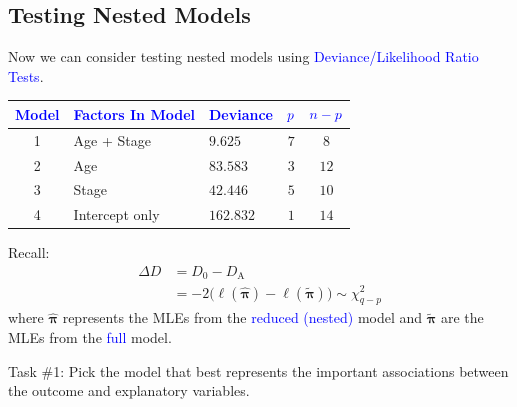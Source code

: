 \documentclass[oneside]{book}\usepackage[]{graphicx}\usepackage[svgnames]{xcolor}
\providecommand{\Vector}[1]{\bm{#1}}%
\begin{document}
\subsection*{Testing Nested Models}
Now we can consider testing nested models using \textcolor{Blue}{Deviance/Likelihood Ratio Tests}.
\begin{table}[!htbp]
      \centering
      \begin{NiceTabular}{cllcc}
            \toprule
            \textcolor{Blue}{Model} & \textcolor{Blue}{Factors In Model} & \textcolor{Blue}{Deviance} & $ \textcolor{Blue}{p} $ & $ \textcolor{Blue}{n-p} $\\
             & Age + Stage & $9.625$ & $ 7 $ & $ 8 $\\
            2 & Age & $83.583$ & $ 3 $ & $ 12 $\\
            3 & Stage & $42.446$ & $ 5 $ & $ 10 $\\
            4 & Intercept only & $162.832$ & $ 1 $ & $14 $\\
            \bottomrule
      \end{NiceTabular}
\end{table}
Recall:
\begin{align*}
      \Delta D
       & =D_0-D_\text{A}                                                                      \\
       & =-2\bigl(\ell(\hat{\Vector{\pi}})-\ell(\tilde{\Vector{\pi}})\bigr) \sim \chi^2_{q-p}
\end{align*}
where $ \hat{\Vector{\pi}} $ represents the MLEs from the \textcolor{Blue}{reduced (nested)} model and $ \tilde{\Vector{\pi}} $ are the MLEs from the \textcolor{Blue}{full} model.
\begin{Example}{}
      Task \#1: Pick the model that best represents the important associations between the
      outcome and explanatory variables.
\end{Example}
\end{document}

